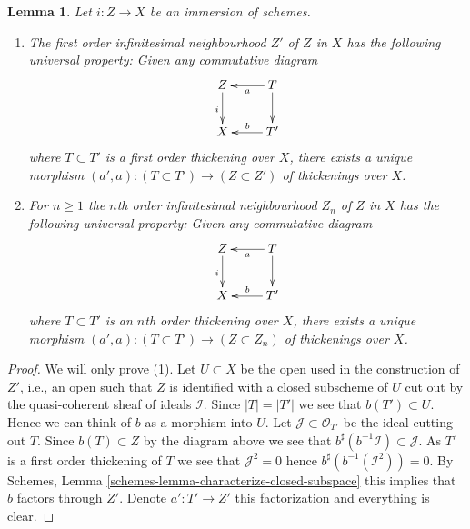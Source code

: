 \documentclass[10pt,a4paper]{amsart}
\theoremstyle{plain}
\newtheorem{lemma}[subsection]{Lemma}
\theoremstyle{definition}
\theoremstyle{remark}
\numberwithin{equation}{subsection}
\begin{document}
\begin{lemma}
\label{lemma-first-order-infinitesimal-neighbourhood}
Let $i : Z \to X$ be an immersion of schemes.
\begin{enumerate}
\item The first order infinitesimal neighbourhood $Z'$ of $Z$ in $X$
has the following universal property: Given any commutative diagram
$$
\xymatrix{
Z \ar[d]_i & T \ar[l]^a \ar[d] \\
X & T' \ar[l]_b
}
$$
where $T \subset T'$ is a first order thickening over $X$, there exists
a unique morphism $(a', a) : (T \subset T') \to (Z \subset Z')$ of
thickenings over $X$.
\item For $n \geq 1$ the $n$th order infinitesimal neighbourhood $Z_n$
of $Z$ in $X$ has the following universal property: Given any commutative
diagram
$$
\xymatrix{
Z \ar[d]_i & T \ar[l]^a \ar[d] \\
X & T' \ar[l]_b
}
$$
where $T \subset T'$ is an $n$th order thickening over $X$, there exists
a unique morphism $(a', a) : (T \subset T') \to (Z \subset Z_n)$ of
thickenings over $X$.
\end{enumerate}
\end{lemma}

\begin{proof}
We will only prove (1).
Let $U \subset X$ be the open used in the construction of $Z'$, i.e., an
open such that $Z$ is identified with a closed subscheme of $U$ cut out by
the quasi-coherent sheaf of ideals $\mathcal{I}$.
Since $|T| = |T'|$ we see that $b(T') \subset U$. Hence we can
think of $b$ as a morphism into $U$. Let $\mathcal{J} \subset \mathcal{O}_{T'}$
be the ideal cutting out $T$. Since $b(T) \subset Z$ by the diagram above
we see that $b^\sharp(b^{-1}\mathcal{I}) \subset \mathcal{J}$. As
$T'$ is a first order thickening of $T$ we see that $\mathcal{J}^2 = 0$
hence $b^\sharp(b^{-1}(\mathcal{I}^2)) = 0$. By
Schemes, Lemma \ref{schemes-lemma-characterize-closed-subspace}
this implies that $b$ factors through $Z'$. Denote $a' : T' \to Z'$
this factorization and everything is clear.
\end{proof}
\end{document}
